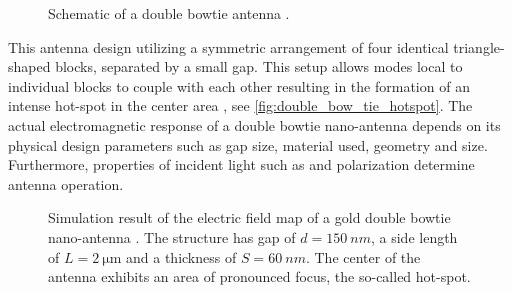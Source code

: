		\begin{figure}[thp]
				\centering
				\caption[Schematic of a double bowtie antenna]{Schematic of a double bowtie antenna \cite{nancy::thesis, Rahbany2015, Rahbany2016}.}
				\label{fig::double_bowtie_antenna_schematic}
		\end{figure}

		This antenna design utilizing a symmetric arrangement of four identical triangle-shaped blocks, separated by a small gap. This setup allows \LSP modes local to individual blocks to couple with each other resulting in the formation of an intense hot-spot in the center area \cite{nancy::85}, see \cref{fig:double_bow_tie_hotspot}. The actual electromagnetic response of a double bowtie nano-antenna depends on its physical design parameters such as gap size, material used, geometry and size. Furthermore, properties of incident light such as \wl and polarization determine antenna operation.

		\begin{figure}[thp]
				\centering
				\label{fig::double_bow_tie_hotspot}
				\caption[Hot-spot of a double bowtie antenna]{Simulation result of the electric field map of a gold double bowtie nano-antenna \cite{nancy::thesis, Rahbany2015, Rahbany2016}. The structure has gap of $d = \SI{150}{nm}$, a side length of $L = \SI{2}{\micro\meter}$ and a thickness of $S = \SI{60}{nm}$. The center of the antenna exhibits an area of pronounced focus, the so-called hot-spot.}
		\end{figure}


